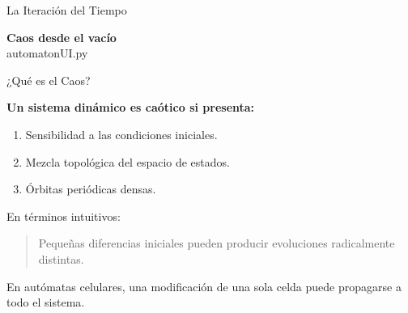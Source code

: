 \documentclass[10pt, aspectratio=169]{beamer}
\begin{document}
\begin{frame}{La Iteración del Tiempo}
    \begin{center}
        \Large \textbf{Caos desde el vacío} \\
	\small automatonUI.py 
      
     
	\normalsize
    \end{center}
\end{frame}
\begin{frame}{¿Qué es el Caos?}

\textbf{Un sistema dinámico es caótico si presenta:}

\vspace{0.4cm}

\begin{enumerate}
    \item Sensibilidad a las condiciones iniciales.
    
    \vspace{0.2cm}
    
    \item Mezcla topológica del espacio de estados.
    
    \vspace{0.2cm}
    
    \item Órbitas periódicas densas.
\end{enumerate}

\vspace{0.4cm}

En términos intuitivos:

\begin{quote}
Pequeñas diferencias iniciales pueden producir
evoluciones radicalmente distintas.
\end{quote}

\vspace{0.4cm}

En autómatas celulares, una modificación de una sola
celda puede propagarse a todo el sistema.

\end{frame}
\end{document}
